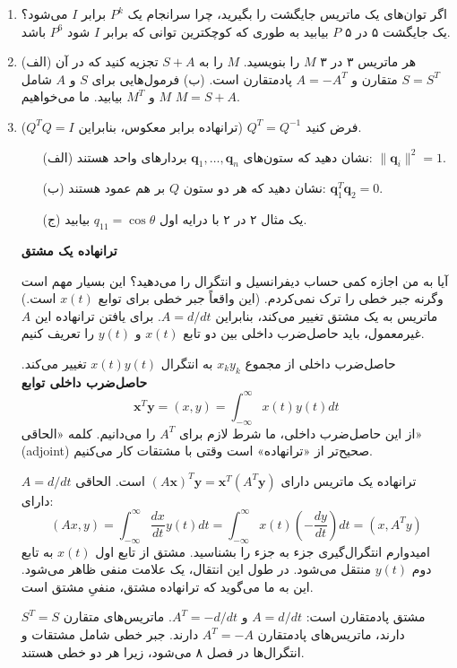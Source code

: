\documentclass[12pt, a4paper]{book}
\begin{document}
\begin{enumerate}
		\item اگر توان‌های یک ماتریس جایگشت را بگیرید، چرا سرانجام یک $P^k$ برابر $I$ می‌شود؟ یک جایگشت ۵ در ۵ $P$ بیابید به طوری که کوچکترین توانی که برابر $I$ شود $P^6$ باشد.
		
		\item (الف) هر ماتریس ۳ در ۳ $M$ را بنویسید. $M$ را به $S+A$ تجزیه کنید که در آن $S=S^T$ متقارن و $A=-A^T$ پادمتقارن است.
		(ب) فرمول‌هایی برای $S$ و $A$ شامل $M$ و $M^T$ بیابید. ما می‌خواهیم $M=S+A$.
		
		\item فرض کنید $Q^T=Q^{-1}$ (ترانهاده برابر معکوس، بنابراین $Q^TQ=I$).
		\begin{itemize}
			\item[(الف)] نشان دهید که ستون‌های $\mathbf{q}_1, \dots, \mathbf{q}_n$ بردارهای واحد هستند: $\|\mathbf{q}_i\|^2=1$.
			\item[(ب)] نشان دهید که هر دو ستون $Q$ بر هم عمود هستند: $\mathbf{q}_1^T\mathbf{q}_2=0$.
			\item[(ج)] یک مثال ۲ در ۲ با درایه اول $q_{11}=\cos\theta$ بیابید.
		\end{itemize}
		
		\item[] \textbf{ترانهاده یک مشتق}
		
		آیا به من اجازه کمی حساب دیفرانسیل و انتگرال را می‌دهید؟ این بسیار مهم است وگرنه جبر خطی را ترک نمی‌کردم. (این واقعاً جبر خطی برای توابع $x(t)$ است.) ماتریس به یک مشتق تغییر می‌کند، بنابراین $A=d/dt$. برای یافتن ترانهاده این $A$ غیرمعمول، باید حاصل‌ضرب داخلی بین دو تابع $x(t)$ و $y(t)$ را تعریف کنیم.
		
		حاصل‌ضرب داخلی از مجموع $x_ky_k$ به انتگرال $x(t)y(t)$ تغییر می‌کند.
		\textbf{حاصل‌ضرب داخلی توابع}
		\[ \mathbf{x}^T\mathbf{y} = (x,y) = \int_{-\infty}^{\infty} x(t)y(t) dt \]
		از این حاصل‌ضرب داخلی، ما شرط لازم برای $A^T$ را می‌دانیم. کلمه «الحاقی» (adjoint) صحیح‌تر از «ترانهاده» است وقتی با مشتقات کار می‌کنیم.
		
		ترانهاده یک ماتریس دارای $(A\mathbf{x})^T\mathbf{y} = \mathbf{x}^T(A^T\mathbf{y})$ است. الحاقی $A=d/dt$ دارای:
		\[ (Ax,y) = \int_{-\infty}^{\infty} \frac{dx}{dt} y(t) dt = \int_{-\infty}^{\infty} x(t) \left(-\frac{dy}{dt}\right) dt = (x, A^Ty) \]
		امیدوارم انتگرال‌گیری جزء به جزء را بشناسید. مشتق از تابع اول $x(t)$ به تابع دوم $y(t)$ منتقل می‌شود. در طول این انتقال، یک علامت منفی ظاهر می‌شود. این به ما می‌گوید که ترانهاده مشتق، منفیِ مشتق است.
		
		مشتق پادمتقارن است: $A=d/dt$ و $A^T=-d/dt$. ماتریس‌های متقارن $S^T=S$ دارند، ماتریس‌های پادمتقارن $A^T=-A$ دارند. جبر خطی شامل مشتقات و انتگرال‌ها در فصل ۸ می‌شود، زیرا هر دو خطی هستند.
		

\end{enumerate}
\end{document}
